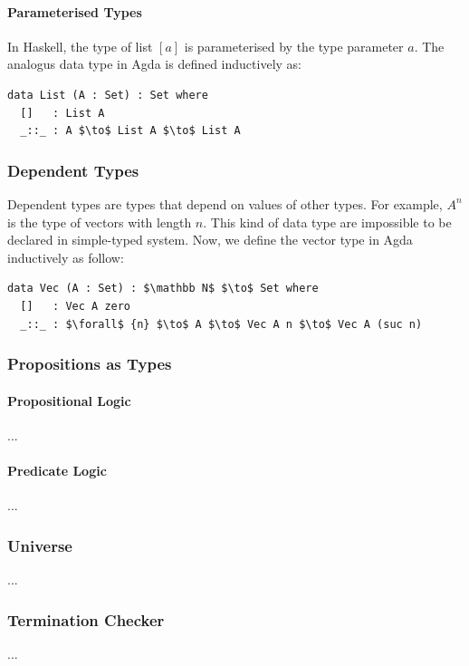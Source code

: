 \documentclass[twoside,openright,final]{bhamthesis}
\begin{document}
\paragraph{Parameterised Types} In Haskell, the type of list \([a]\) is parameterised by the type
parameter \(a\). The analogus data type in Agda is defined inductively as:
\begin{lstlisting}[mathescape=true,xleftmargin=.3\textwidth]
data List (A : Set) : Set where
  []   : List A
  _::_ : A $\to$ List A $\to$ List A
\end{lstlisting} 

\subsubsection{Dependent Types}
\par Dependent types are types that depend on values of other
types. For example, \(A^n\) is the type of vectors with
length \(n\). This kind of data type are impossible to be declared in
simple-typed system. Now, we define the vector type in Agda
inductively as follow:
\begin{lstlisting}[mathescape=true,xleftmargin=.3\textwidth]
data Vec (A : Set) : $\mathbb N$ $\to$ Set where
  []   : Vec A zero
  _::_ : $\forall$ {n} $\to$ A $\to$ Vec A n $\to$ Vec A (suc n)
\end{lstlisting} 

\subsubsection{Propositions as Types}
\paragraph{Propositional Logic} ...
\paragraph{Predicate Logic} ...

\subsubsection{Universe}
\par ...

\subsubsection{Termination Checker}
\par ...
\end{document}
